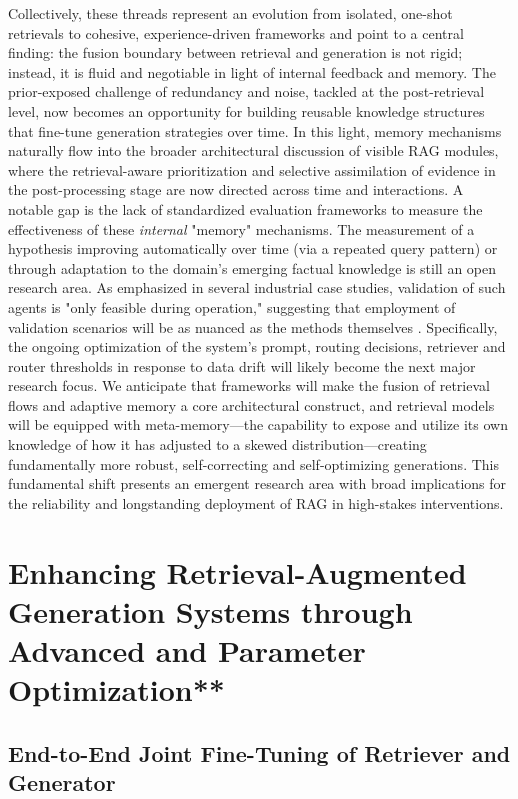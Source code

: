 \documentclass[11pt,a4paper]{article}
\begin{document}
Collectively, these threads represent an evolution from isolated, one-shot retrievals to cohesive, experience-driven frameworks and point to a central finding: the fusion boundary between retrieval and generation is not rigid; instead, it is fluid and negotiable in light of internal feedback and memory. The prior-exposed challenge of redundancy and noise, tackled at the post-retrieval level, now becomes an opportunity for building reusable knowledge structures that fine-tune generation strategies over time. In this light, memory mechanisms naturally flow into the broader architectural discussion of visible RAG modules, where the retrieval-aware prioritization and selective assimilation of evidence in the post-processing stage are now directed across time and interactions. A notable gap is the lack of standardized evaluation frameworks to measure the effectiveness of these \emph{internal} "memory" mechanisms. The measurement of a hypothesis improving automatically over time (via a repeated query pattern) or through adaptation to the domain's emerging factual knowledge is still an open research area. As emphasized in several industrial case studies, validation of such agents is "only feasible during operation," suggesting that employment of validation scenarios will be as nuanced as the methods themselves \cite{arxiv:2401.05856v1}. Specifically, the ongoing optimization of the system's prompt, routing decisions, retriever and router thresholds in response to data drift will likely become the next major research focus. We anticipate that frameworks will make the fusion of retrieval flows and adaptive memory a core architectural construct, and retrieval models will be equipped with meta-memory---the capability to expose and utilize its own knowledge of how it has adjusted to a skewed distribution---creating fundamentally more robust, self-correcting and self-optimizing generations. This fundamental shift presents an emergent research area with broad implications for the reliability and longstanding deployment of RAG in high-stakes interventions.


\section{Enhancing Retrieval-Augmented Generation Systems through Advanced and Parameter Optimization**}



\subsection{End-to-End Joint Fine-Tuning of Retriever and Generator}
\end{document}
